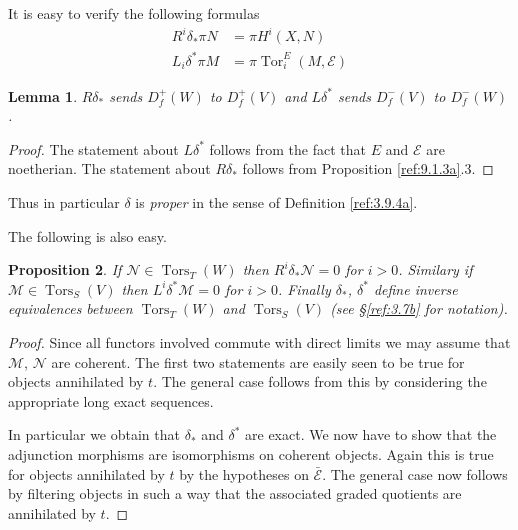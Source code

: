 \documentclass{amsproc}
\def\Escr{{\mathcal E}}
\def\Mscr{{\mathcal M}}
\def\Nscr{{\mathcal N}}
\def\Tors{\operatorname{Tors}}
\def\Tor{\operatorname {Tor}}
\def\Tors{\operatorname {Tors}}
\newtheorem{lemmas}{Lemma}[subsection]
\newtheorem{propositions}[lemmas]{Proposition}
\theoremstyle{definition}
\theoremstyle{remark}
\numberwithin{equation}{section}
\numberwithin{table}{section}
\numberwithin{figure}{section}
\begin{document}
It is easy to verify the following formulas
\begin{equation}
\label{ref:9.5a}
\begin{split}
R^i\delta_\ast \pi N&= \pi H^i(X,N)\\
L_i\delta^\ast \pi M&= \pi \Tor^E_i(M,\Escr)
\end{split}
\end{equation}
\begin{lemmas}
$R\delta_\ast$ sends $D^+_f(W)$ to $D^+_f(V)$ and
$L\delta^\ast$ sends $D^-_f(V)$ to $D^-_f(W)$.
\end{lemmas} 
\begin{proof} The statement about $L\delta^\ast$ follows from the fact
that $E$ and $\Escr$ are noetherian. The statement about $R\delta_\ast$
follows from Proposition \ref{ref:9.1.3a}.3.
\end{proof}
Thus in particular $\delta$ is \emph{proper} in the sense of
Definition \ref{ref:3.9.4a}.

The following is also easy.

\begin{propositions}
\label{ref:9.1.6a}
If $\Nscr\in \Tors_T(W)$ then $R^i\delta_\ast\Nscr=0$ for $i>0$. 
Similary if $\Mscr\in \Tors_S(V)$ then $L^i\delta^\ast \Mscr=0$ for
$i>0$. Finally $\delta_\ast$, $\delta^\ast$ define inverse equivalences 
between
$\Tors_T(W)$ and $\Tors_S(V)$ (see \S\ref{ref:3.7b} for notation).
\end{propositions}
\begin{proof} Since all functors involved commute with direct limits we
may assume that $\Mscr$, $\Nscr$ are coherent. The first two statements
are easily seen to be true for objects annihilated by $t$. The general
case follows from this by considering the appropriate long exact
sequences.

In particular we obtain that $\delta_\ast$ and $\delta^\ast$ are
exact.  We now have to show that the adjunction morphisms are
isomorphisms on coherent objects.  Again this is true for objects
annihilated by $t$ by the hypotheses on $\bar{\Escr}$. The general
case now follows by filtering objects in such a way that the
associated graded quotients are annihilated by $t$.
\end{proof}
\end{document}
